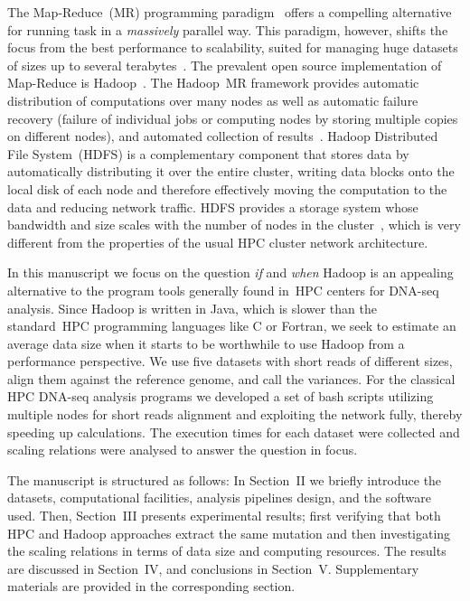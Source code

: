 \documentclass[11pt, oneside]{article}   	%
\begin{document}
The Map-Reduce~(MR) programming paradigm~\cite{hadoop} offers a compelling alternative for running task in a {\it massively} parallel way. This paradigm, however, shifts the focus from the best performance to scalability, suited for managing huge datasets of sizes up to several terabytes~\cite{lin2010}.
The prevalent open source implementation of Map-Reduce is Hadoop~\cite{hadoop,Hadoop:Guide}. 
The Hadoop~MR framework provides automatic distribution of computations over many nodes as well as automatic failure recovery (failure of individual jobs or computing nodes by storing multiple copies on different nodes), and automated collection of results~\cite{Hadoop:Guide}. Hadoop Distributed File System~(HDFS) is a complementary component that stores data by automatically distributing it over the entire cluster, writing data blocks onto the local disk of each node and therefore effectively moving the computation to the data and reducing network traffic. HDFS provides a storage system whose bandwidth and size scales with the number of nodes in the cluster~\cite{Sammer:2012}, which is very different from the properties of the usual HPC cluster network architecture. 

In this manuscript we focus on the question {\it if} and {\it when} Hadoop is an appealing alternative to the program tools generally found in~HPC centers for DNA-seq analysis. Since Hadoop is written in Java, which is slower than the standard~HPC programming languages like C or Fortran, we seek to estimate an average data size when it starts to be worthwhile to use Hadoop from a performance perspective. We use five datasets with short reads of different sizes, align them against the reference genome, and call the variances.
For the classical HPC DNA-seq analysis programs we developed a set of bash scripts utilizing multiple nodes for short reads alignment and exploiting the network fully, thereby speeding up calculations.
The execution times for each dataset were collected and scaling relations were analysed to answer the question in focus.

The manuscript is structured as follows: In Section~II we briefly introduce the datasets, computational facilities, analysis pipelines design,  and the software used. Then, Section~III presents experimental results; first verifying that both HPC and Hadoop approaches extract the same mutation and then investigating the scaling relations in terms of data size and computing resources. The results are discussed in Section~IV, and conclusions in Section~V. Supplementary materials are provided in the corresponding section.
\end{document}
